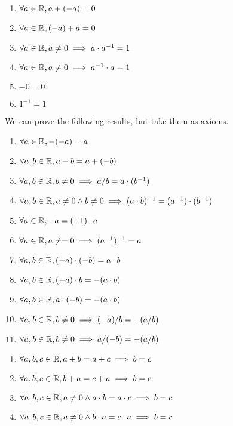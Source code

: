 
\begin{enumerate}[resume*]
\item $\forall a\in\mathbb{R}, a+(-a)=0$
\item $\forall a\in\mathbb{R}, (-a)+a=0$
\item $\forall a\in\mathbb{R}, a\neq0\implies a\cdot a^{-1} = 1$
\item $\forall a\in\mathbb{R}, a\neq0\implies a^{-1}\cdot a = 1$
\item $-0=0$
\item $1^{-1}=1$
\end{enumerate}

\M We can prove the following results, but take them as axioms.
\begin{enumerate}[resume*]
\item $\forall a\in\mathbb{R}, -(-a)=a$
\item $\forall a,b\in\mathbb{R}, a-b = a+(-b)$
\item $\forall a,b\in\mathbb{R}, b\neq0\implies a/b=a\cdot(b^{-1})$
\item $\forall a,b\in\mathbb{R}, a\neq0\land b\neq0\implies (a\cdot b)^{-1}=(a^{-1})\cdot(b^{-1})$
\item $\forall a\in\mathbb{R}, -a = (-1)\cdot a$
\item $\forall a\in\mathbb{R}, a\neq=0\implies (a^{-1})^{-1}=a$
\item $\forall a,b\in\mathbb{R}, (-a)\cdot(-b)=a\cdot b$
\item $\forall a,b\in\mathbb{R}, (-a)\cdot b=-(a\cdot b)$
\item $\forall a,b\in\mathbb{R}, a\cdot(-b)=-(a\cdot b)$
\item $\forall a,b\in\mathbb{R}, b\neq0\implies (-a)/b=-(a/b)$
\item $\forall a,b\in\mathbb{R}, b\neq0\implies a/(-b)=-(a/b)$
\end{enumerate}

\begin{enumerate}[resume*]
\item $\forall a,b,c\in\mathbb{R}, a+b=a+c\implies b=c$
\item $\forall a,b,c\in\mathbb{R}, b+a=c+a\implies b=c$
\item $\forall a,b,c\in\mathbb{R}, a\neq0\land a\cdot b=a\cdot c\implies b=c$
\item $\forall a,b,c\in\mathbb{R}, a\neq0\land b\cdot a=c\cdot a\implies b=c$
\end{enumerate}

